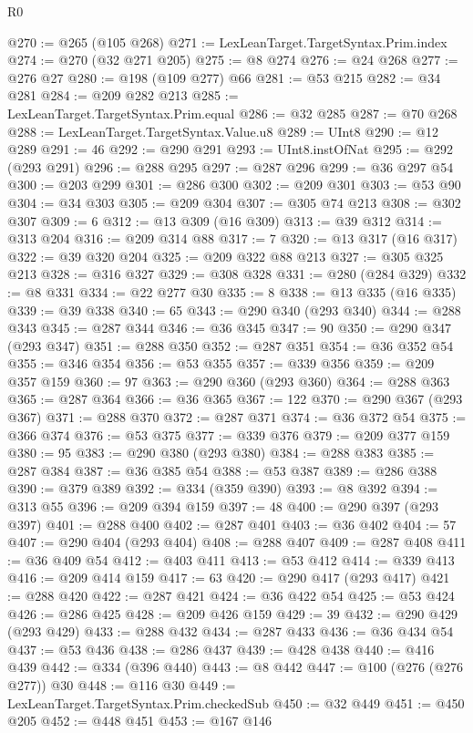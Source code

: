 \begin{lexlean}{R0}
\begin{coremodule}
{{{{{{{{{{{{{{{{{{{@270 := @265 (@105 @268)
@271 := LexLeanTarget.TargetSyntax.Prim.index
@274 := @270 (@32 @271 @205)
@275 := @8 @274
@276 := @24 @268
@277 := @276 @27
@280 := @198 (@109 @277) @66
@281 := @53 @215
@282 := @34 @281
@284 := @209 @282 @213
@285 := LexLeanTarget.TargetSyntax.Prim.equal
@286 := @32 @285
@287 := @70 @268
@288 := LexLeanTarget.TargetSyntax.Value.u8
@289 := UInt8
@290 := @12 @289
@291 := 46
@292 := @290 @291
@293 := UInt8.instOfNat
@295 := @292 (@293 @291)
@296 := @288 @295
@297 := @287 @296
@299 := @36 @297 @54
@300 := @203 @299
@301 := @286 @300
@302 := @209 @301
@303 := @53 @90
@304 := @34 @303
@305 := @209 @304
@307 := @305 @74 @213
@308 := @302 @307
@309 := 6
@312 := @13 @309 (@16 @309)
@313 := @39 @312
@314 := @313 @204
@316 := @209 @314 @88
@317 := 7
@320 := @13 @317 (@16 @317)
@322 := @39 @320 @204
@325 := @209 @322 @88 @213
@327 := @305 @325 @213
@328 := @316 @327
@329 := @308 @328
@331 := @280 (@284 @329)
@332 := @8 @331
@334 := @22 @277 @30
@335 := 8
@338 := @13 @335 (@16 @335)
@339 := @39 @338
@340 := 65
@343 := @290 @340 (@293 @340)
@344 := @288 @343
@345 := @287 @344
@346 := @36 @345
@347 := 90
@350 := @290 @347 (@293 @347)
@351 := @288 @350
@352 := @287 @351
@354 := @36 @352 @54
@355 := @346 @354
@356 := @53 @355
@357 := @339 @356
@359 := @209 @357 @159
@360 := 97
@363 := @290 @360 (@293 @360)
@364 := @288 @363
@365 := @287 @364
@366 := @36 @365
@367 := 122
@370 := @290 @367 (@293 @367)
@371 := @288 @370
@372 := @287 @371
@374 := @36 @372 @54
@375 := @366 @374
@376 := @53 @375
@377 := @339 @376
@379 := @209 @377 @159
@380 := 95
@383 := @290 @380 (@293 @380)
@384 := @288 @383
@385 := @287 @384
@387 := @36 @385 @54
@388 := @53 @387
@389 := @286 @388
@390 := @379 @389
@392 := @334 (@359 @390)
@393 := @8 @392
@394 := @313 @55
@396 := @209 @394 @159
@397 := 48
@400 := @290 @397 (@293 @397)
@401 := @288 @400
@402 := @287 @401
@403 := @36 @402
@404 := 57
@407 := @290 @404 (@293 @404)
@408 := @288 @407
@409 := @287 @408
@411 := @36 @409 @54
@412 := @403 @411
@413 := @53 @412
@414 := @339 @413
@416 := @209 @414 @159
@417 := 63
@420 := @290 @417 (@293 @417)
@421 := @288 @420
@422 := @287 @421
@424 := @36 @422 @54
@425 := @53 @424
@426 := @286 @425
@428 := @209 @426 @159
@429 := 39
@432 := @290 @429 (@293 @429)
@433 := @288 @432
@434 := @287 @433
@436 := @36 @434 @54
@437 := @53 @436
@438 := @286 @437
@439 := @428 @438
@440 := @416 @439
@442 := @334 (@396 @440)
@443 := @8 @442
@447 := @100 (@276 (@276 @277)) @30
@448 := @116 @30
@449 := LexLeanTarget.TargetSyntax.Prim.checkedSub
@450 := @32 @449
@451 := @450 @205
@452 := @448 @451
@453 := @167 @146
}}}}}}}}}}}}}}}}}}}
\end{coremodule}
\end{lexlean}
